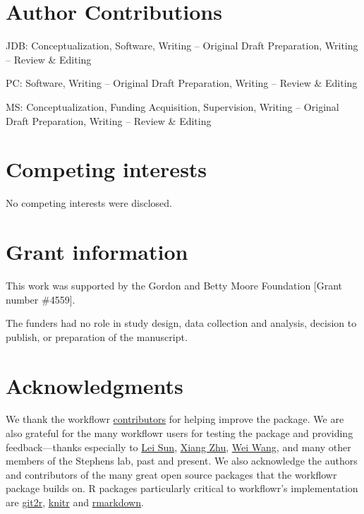 \documentclass[9pt,a4paper]{extarticle}
\begin{document}
\section*{Author Contributions}

JDB: Conceptualization, Software, Writing – Original Draft Preparation,
Writing – Review \& Editing

PC: Software, Writing – Original Draft Preparation, Writing – Review \&
Editing

MS: Conceptualization, Funding Acquisition, Supervision, Writing –
Original Draft Preparation, Writing – Review \& Editing


\section*{Competing interests}

No competing interests were disclosed.


\section*{Grant information}

This work was supported by the Gordon and Betty Moore Foundation [Grant
number \#4559].

The funders had no role in study design, data collection and analysis,
decision to publish, or preparation of the manuscript.


\section*{Acknowledgments}

We thank the workflowr
\href{https://github.com/jdblischak/workflowr/graphs/contributors}{contributors}
for helping improve the package. We are also grateful for the many
workflowr users for testing the package and providing feedback---thanks
especially to \href{https://github.com/LSun}{Lei Sun},
\href{https://github.com/xiangzhu}{Xiang Zhu},
\href{https://github.com/NKweiwang}{Wei Wang}, and many other members of
the Stephens lab, past and present. We also acknowledge the authors and
contributors of the many great open source packages that the workflowr
package builds on. R packages particularly critical to workflowr's
implementation are
\href{https://cran.r-project.org/web/packages/git2r/index.html}{git2r},
\href{https://github.com/yihui/knitr}{knitr} and
\href{http://rmarkdown.rstudio.com/}{rmarkdown}.

{\small

}
\end{document}
